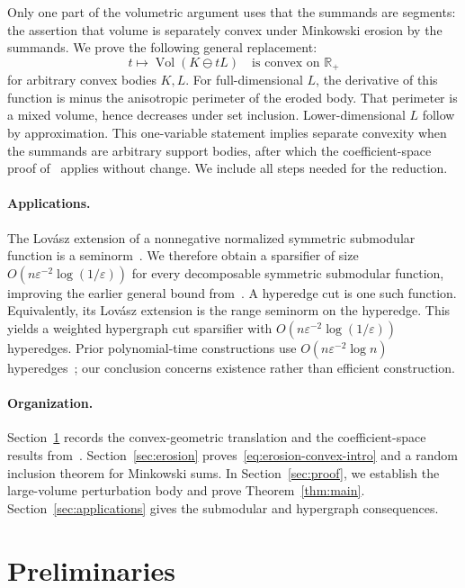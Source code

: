 \documentclass[11pt]{article}
\theoremstyle{remark}
\newcommand{\R}{\mathbb{R}}
\newcommand{\Vol}{\operatorname{Vol}}
\newcommand{\eps}{\varepsilon}
\newcommand{\MinkDiff}{\mathbin{\ominus}}
\begin{document}
Only one part of the volumetric argument uses that the summands are
segments: the assertion that volume is separately convex under
Minkowski erosion by the summands.  We prove the following general
replacement:
\begin{equation}\label{eq:erosion-convex-intro}
  t\longmapsto \Vol(K\MinkDiff tL)
  \quad\text{is convex on }\R_+
\end{equation}
for arbitrary convex bodies $K,L$.  For full-dimensional $L$, the
derivative of this function is minus the anisotropic perimeter of the
eroded body.  That perimeter is a mixed volume, hence decreases under
set inclusion.  Lower-dimensional $L$ follow by approximation.  This
one-variable statement implies separate convexity when the summands
are arbitrary support bodies, after which the coefficient-space proof
of~\cite{RR26} applies without change.  We include all steps needed for
the reduction.

\paragraph{Applications.}
The Lov\'asz extension of a nonnegative normalized symmetric
submodular function is a seminorm~\cite{Lovasz83}.  We therefore obtain
a sparsifier of size
$O(n\eps^{-2}\log(1/\eps))$ for every decomposable symmetric
submodular function, improving the earlier general bound
from~\cite{JLLS23}.  A hyperedge cut is one such
function.  Equivalently, its Lov\'asz extension is the range seminorm
on the hyperedge.  This yields a weighted hypergraph cut sparsifier
with $O(n\eps^{-2}\log(1/\eps))$ hyperedges.  Prior polynomial-time
constructions use $O(n\eps^{-2}\log n)$ hyperedges~\cite{CKN20}; our
conclusion concerns existence rather than efficient construction.

\paragraph{Organization.}
Section~\ref{sec:preliminaries} records the convex-geometric
translation and the coefficient-space results from~\cite{RR26}.
Section~\ref{sec:erosion} proves~\eqref{eq:erosion-convex-intro} and a
random inclusion theorem for Minkowski sums.  In
Section~\ref{sec:proof}, we establish the large-volume perturbation
body and prove Theorem~\ref{thm:main}.  Section~\ref{sec:applications}
gives the submodular and hypergraph consequences.

\section{Preliminaries}\label{sec:preliminaries}
\end{document}

